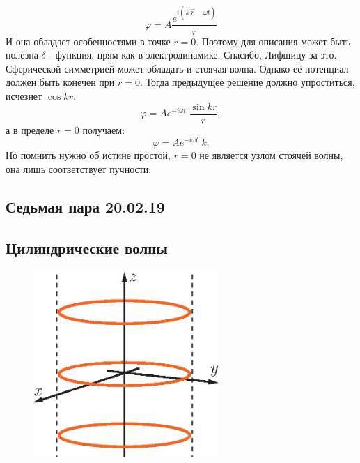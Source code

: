\documentclass[14pt,a4paper,oneside]{extarticle}	%
\begin{document}
\begin{equation*}
\varphi  = A \frac{e^{i(\vec{k}\vec{r}-\omega t)}}{r}
\end{equation*}
И она обладает особенностями в точке $ r = 0 $. Поэтому для описания может быть полезна $ \delta $ - функция, прям как в электродинамике. Спасибо, Лифшицу за это.
Сферической симметрией может обладать и стоячая волна.
Однако её потенциал должен быть конечен при $ r = 0 $.
Тогда предыдущее решение должно упроститься, исчезнет $ \cos kr $.
\begin{equation*}
\varphi  = A e^{-i\omega t}\; \frac{\sin kr}{r},
\end{equation*}
а в пределе $ r = 0 $ получаем:
\begin{equation*}
\varphi  = A e^{-i\omega t}\;k.
\end{equation*}
Но помнить нужно об истине простой, $ r = 0 $ не является узлом стоячей волны, она лишь соответствует пучности.  

\newpage
\begin{center}
	\section*{Седьмая пара 20.02.19} %
	
	\subsection*{Цилиндрические волны} %
\end{center}

\begin{figure}[h!] 	%
	\centering 		%
	\includegraphics[width=7cm]{11.eps} %
\end{figure}
\end{document}
